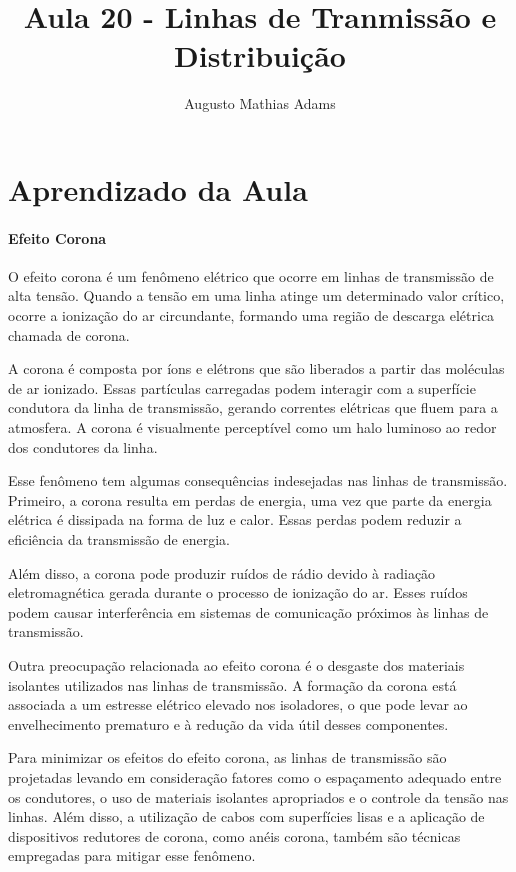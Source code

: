 \documentclass[a4paper, 12pt, onecolumn,singlespacing]{article}
\title{Aula 20 - Linhas de Tranmissão e Distribuição}
\author[1]{Augusto Mathias Adams}
\affil[1]{augusto.adams@ufpr.br}
\begin{document}
	
	\maketitle
	
	\section{Aprendizado da Aula}
		
		\paragraph{Efeito Corona}
		
		O efeito corona é um fenômeno elétrico que ocorre em linhas de transmissão de alta tensão. Quando a tensão em uma linha atinge um determinado valor crítico, ocorre a ionização do ar circundante, formando uma região de descarga elétrica chamada de corona.
		
		A corona é composta por íons e elétrons que são liberados a partir das moléculas de ar ionizado. Essas partículas carregadas podem interagir com a superfície condutora da linha de transmissão, gerando correntes elétricas que fluem para a atmosfera. A corona é visualmente perceptível como um halo luminoso ao redor dos condutores da linha.
		
		Esse fenômeno tem algumas consequências indesejadas nas linhas de transmissão. Primeiro, a corona resulta em perdas de energia, uma vez que parte da energia elétrica é dissipada na forma de luz e calor. Essas perdas podem reduzir a eficiência da transmissão de energia.
		
		Além disso, a corona pode produzir ruídos de rádio devido à radiação eletromagnética gerada durante o processo de ionização do ar. Esses ruídos podem causar interferência em sistemas de comunicação próximos às linhas de transmissão.
		
		Outra preocupação relacionada ao efeito corona é o desgaste dos materiais isolantes utilizados nas linhas de transmissão. A formação da corona está associada a um estresse elétrico elevado nos isoladores, o que pode levar ao envelhecimento prematuro e à redução da vida útil desses componentes.
		
		Para minimizar os efeitos do efeito corona, as linhas de transmissão são projetadas levando em consideração fatores como o espaçamento adequado entre os condutores, o uso de materiais isolantes apropriados e o controle da tensão nas linhas. Além disso, a utilização de cabos com superfícies lisas e a aplicação de dispositivos redutores de corona, como anéis corona, também são técnicas empregadas para mitigar esse fenômeno.
		
\end{document}
